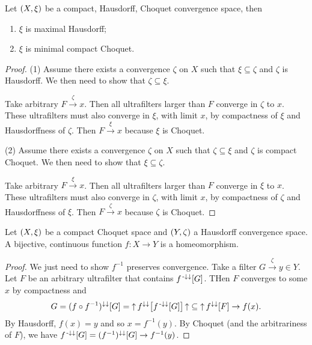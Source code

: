 \begin{proposition} \label{maximalHausdroffMinimalCompactChoquet}
Let $\left( X,\xi \right)$ be a compact, Hausdorff, Choquet convergence space, then
\begin{enumerate}
\item $\xi$ is maximal Hausdorff;
\item $\xi$ is minimal compact Choquet.
\end{enumerate}
\end{proposition}
\begin{proof}
(1) Assume there exists a convergence $\zeta$ on $X$ such that $\xi \subseteq \zeta$ and $\zeta$ is Hausdorff. We then need to show that $\zeta \subseteq \xi$.

Take arbitrary $F \overset{\zeta}{\longrightarrow} x$. Then all ultrafilters larger than $F$ converge in $\zeta$ to $x$. These ultrafilters must also converge in $\xi$, with limit $x$, by compactness of $\xi$ and Hausdorffness of $\zeta$. Then $F \overset{\xi}{\longrightarrow} x$ because $\xi$ is Choquet.

(2) Assume there exists a convergence $\zeta$ on $X$ such that $\zeta \subseteq \xi$ and $\zeta$ is compact Choquet. We then need to show that $\xi \subseteq \zeta$.

Take arbitrary $F \overset{\xi}{\longrightarrow} x$. Then all ultrafilters larger than $F$ converge in $\xi$ to $x$. These ultrafilters must also converge in $\zeta$, with limit $x$, by compactness of $\zeta$ and Hausdorffness of $\xi$. Then $F \overset{\zeta}{\longrightarrow} x$ because $\zeta$ is Choquet.
\end{proof}

\begin{proposition}
Let $\left( X,\xi \right)$ be a compact Choquet space and $\left( Y, \zeta \right)$ a Hausdorff convergence space. A bijective, continuous function $f: X\to Y$ is a homeomorphism.
\end{proposition}
\begin{proof}
We just need to show $f^{-1}$ preserves convergence. Take a filter $G\overset{\zeta}{\longrightarrow} y \in Y$. Let $F$ be an arbitrary ultrafilter that contains $f^{{\text{\hspace{0.15em}-}\downarrow}\downarrow}[G]$. THen $F$ converges to some $x$ by compactness and
\[ G = (f\circ f^{-1})^{\downarrow\downarrow}[G] = \operatorname{\uparrow} f^{\downarrow\downarrow}\big[f^{{\text{\hspace{0.15em}-}\downarrow}\downarrow}[G]\big]\operatorname{\uparrow} \subseteq \operatorname{\uparrow} f^{\downarrow\downarrow}[F] \to f(x). \]
By Hausdorff, $f(x) = y$ and so $x = f^{-1}(y)$. By Choquet (and the arbitrariness of $F$), we have $f^{{\text{\hspace{0.15em}-}\downarrow}\downarrow}[G] = (f^{-1})^{\downarrow\downarrow}[G] \to f^{-1}(y)$.
\end{proof}

